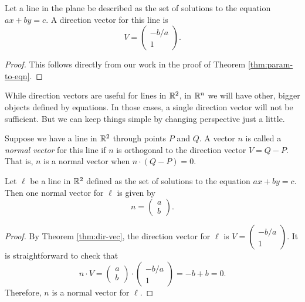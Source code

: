 \documentclass[elementsmain.tex]{subfiles}
\begin{document}
\begin{theorem} \label{thm:dir-vec}
Let a line in the plane be described as the set of solutions to the equation $ax+by=c$. A direction vector for this line is 
\[
V = \begin{pmatrix} -b/a \\ 1 \end{pmatrix}.
\]
\end{theorem}

\begin{proof}
This follows directly from our work in the proof of Theorem \ref{thm:param-to-eqn}. 
\end{proof}

While direction vectors are useful for lines in $\mathbb{R}^2$, in $\mathbb{R}^n$ we will have other, bigger objects defined by equations. In those cases, a single direction vector will not be sufficient. But we can keep things simple by changing perspective just a little. 

\begin{definition} Suppose we have a line in $\mathbb{R}^2$ through points $P$ and $Q$. A vector $n$ is called a \emph{normal vector} for this line if $n$ is orthogonal to the direction vector $V= Q-P$. That is, $n$ is a normal vector when $n\cdot (Q-P) = 0$.
\end{definition}

\begin{theorem}
Let $\ell$ be a line in $\mathbb{R}^2$ defined as the set of solutions to the equation $ax+by =c$. Then one normal vector for $\ell$ is given by
\[
n = \begin{pmatrix} a \\ b \end{pmatrix}.
\]
\end{theorem}

\begin{proof}
By Theorem \ref{thm:dir-vec}, the direction vector for $\ell$ is $V = (\begin{smallmatrix} -b/a \\ 1 \end{smallmatrix})$. It is straightforward to check that
\[
n \cdot V = \begin{pmatrix}a \\ b \end{pmatrix} \cdot \begin{pmatrix} -b/a \\ 1 \end{pmatrix} = -b + b = 0.
\]
Therefore, $n$ is a normal vector for $\ell$.
\end{proof}
\end{document}
